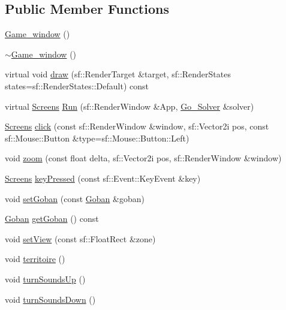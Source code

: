 \subsection*{Public Member Functions}
\begin{DoxyCompactItemize}
\item 
\hyperlink{class_game__window_a1d0ac99e8c117a5016883b52446c6530}{Game\+\_\+window} ()
\item 
\hyperlink{class_game__window_a5e84f0f55c4526bb0ea3a592c439c16f}{$\sim$\+Game\+\_\+window} ()
\item 
virtual void \hyperlink{class_game__window_aafdea9d00265261abfac6ad233b54638}{draw} (sf\+::\+Render\+Target \&target, sf\+::\+Render\+States states=sf\+::\+Render\+States\+::\+Default) const
\item 
virtual \hyperlink{_globals_8h_a3d5776bab98402b03be09156bacf4f68}{Screens} \hyperlink{class_game__window_a555769f4e8511e45d6623658dc736be5}{Run} (sf\+::\+Render\+Window \&App, \hyperlink{class_go___solver}{Go\+\_\+\+Solver} \&solver)
\item 
\hyperlink{_globals_8h_a3d5776bab98402b03be09156bacf4f68}{Screens} \hyperlink{class_game__window_afa942088809bf10731bb31d0d37b878d}{click} (const sf\+::\+Render\+Window \&window, sf\+::\+Vector2i pos, const sf\+::\+Mouse\+::\+Button \&type=sf\+::\+Mouse\+::\+Button\+::\+Left)
\item 
void \hyperlink{class_game__window_a9b9b15469cb0ced1a22f28e447983b56}{zoom} (const float delta, sf\+::\+Vector2i pos, sf\+::\+Render\+Window \&window)
\item 
\hyperlink{_globals_8h_a3d5776bab98402b03be09156bacf4f68}{Screens} \hyperlink{class_game__window_a72304de2044c29f1373037bd818f674f}{key\+Pressed} (const sf\+::\+Event\+::\+Key\+Event \&key)
\item 
void \hyperlink{class_game__window_ac674f6d0db2bf60e92a0072d94e4c019}{set\+Goban} (const \hyperlink{class_goban}{Goban} \&goban)
\item 
\hyperlink{class_goban}{Goban} \hyperlink{class_game__window_a782f1aca3d28de1350375b10459073d4}{get\+Goban} () const
\item 
void \hyperlink{class_game__window_a5d130eb03ee63de5d63f91bcf6c56fa5}{set\+View} (const sf\+::\+Float\+Rect \&zone)
\item 
void \hyperlink{class_game__window_a8ad36b6ebe4760954dd01e94fc5762f1}{territoire} ()
\item 
void \hyperlink{class_game__window_a1ba4f62d58089e3de5da00538889cb25}{turn\+Sounds\+Up} ()
\item 
void \hyperlink{class_game__window_aa934e0cb8983cf30af634deff8581848}{turn\+Sounds\+Down} ()
\end{DoxyCompactItemize}


